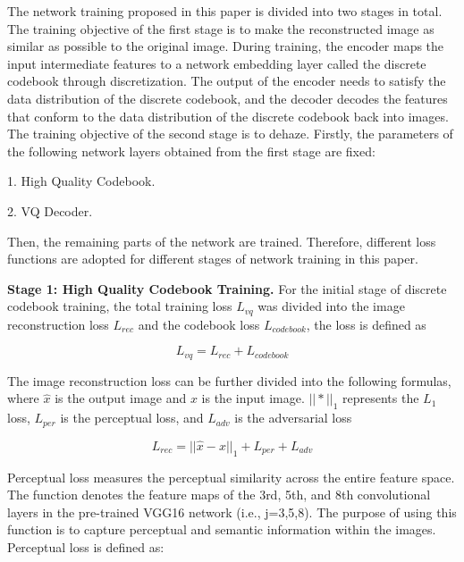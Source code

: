 \documentclass[lettersize,journal]{IEEEtran}
\begin{document}
The network training proposed in this paper is divided into two stages in total. The training objective of the first stage is to make the reconstructed image as similar as possible to the original image. During training, the encoder maps the input intermediate features to a network embedding layer called the discrete codebook through discretization. The output of the encoder needs to satisfy the data distribution of the discrete codebook, and the decoder decodes the features that conform to the data distribution of the discrete codebook back into images. The training objective of the second stage is to dehaze. Firstly, the parameters of the following network layers obtained from the first stage are fixed: 

\begin{list}{}{}
	\item{1. High Quality Codebook.}
	
	\item{2. VQ Decoder.}

\end{list}

Then, the remaining parts of the network are trained. Therefore, different loss functions are adopted for different stages of network training in this paper.

{\bf{Stage 1: High Quality Codebook Training.}} For the initial stage of discrete codebook training, the total training loss $L_{vq}$ was divided into the image reconstruction loss $L_{rec}$ and the codebook loss $L_{codebook}$, the loss is defined as

\begin{equation}
\label{vq_loss}
L_{vq} = L_{rec} + L_{codebook}
\end{equation}

The image reconstruction loss can be further divided into the following formulas, where $\hat{x}$ is the output image and $x$ is the input image. $|| * ||_{1}$ represents the $L_{1}$ loss, $L_{per}$ is the perceptual loss, and $L_{adv}$ is the adversarial loss

\begin{equation}
\label{reconstruction_loss}
L_{rec} = || \hat{x} - x ||_{1} + L_{per} + L_{adv}
\end{equation}

Perceptual loss measures the perceptual similarity across the entire feature space. The function denotes the feature maps of the 3rd, 5th, and 8th convolutional layers in the pre-trained VGG16\cite{simonyan2014very} network (i.e., j=3,5,8). The purpose of using this function is to capture perceptual and semantic information within the images. Perceptual loss is defined as\cite{johnson2016perceptual}:
\end{document}
